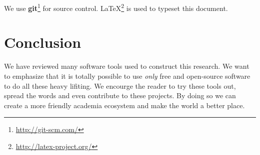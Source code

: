We use \textbf{git}\footnote{\url{http://git-scm.com/}} for source control. \LaTeX\footnote{\url{http://latex-project.org/}} is used to typeset this document.

\section*{Conclusion}
We have reviewed many software tools used to construct this research. We want to emphasize that it is totally possible to use \textit{only} free and open-source software to do all these heavy lifiting. We encourge the reader to try these tools out, spread the words and even contribute to these projects. By doing so we can create a more friendly academia ecosystem and make the world a better place.
